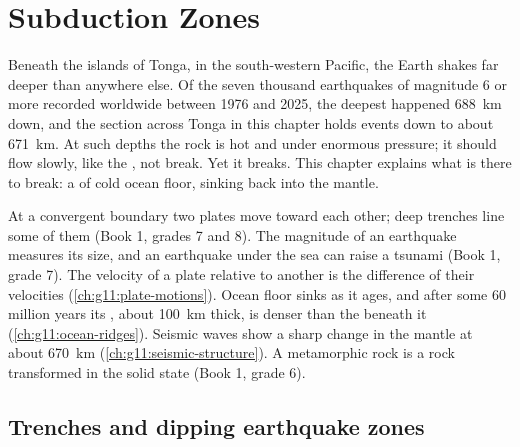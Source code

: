\chapter{Subduction Zones}\label{ch:g11:subduction-zones}

Beneath the islands of Tonga, in the south-western Pacific, the Earth shakes
far deeper than anywhere else. Of the seven thousand earthquakes of magnitude
6 or more recorded worldwide between 1976 and 2025, the deepest happened
\qty{688}{km} down, and the section across Tonga in this chapter holds events down
to about \qty{671}{km}. At such depths the rock is hot and under enormous
pressure; it should flow slowly, like the , not break. Yet it
breaks. This chapter explains what is there to break: a  of cold ocean
floor, sinking back into the mantle.

\begin{recall}
At a convergent boundary two plates move toward each other; deep trenches
line some of them (Book 1, grades 7 and 8). The magnitude of an earthquake
measures its size, and an earthquake under the sea can raise a tsunami
(Book 1, grade 7). The velocity of a plate relative to another is the
difference of their velocities (\cref{ch:g11:plate-motions}). Ocean floor
sinks as it ages, and after some 60 million years its , about
\qty{100}{km} thick, is denser than the  beneath it
(\cref{ch:g11:ocean-ridges}). Seismic waves show a sharp change in the mantle
at about \qty{670}{km} (\cref{ch:g11:seismic-structure}). A metamorphic rock
is a rock transformed in the solid state (Book 1, grade 6).
\end{recall}

\section{Trenches and dipping earthquake zones}


